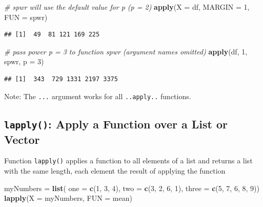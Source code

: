 \documentclass[]{book}
\newenvironment{Shaded}{\begin{snugshade}}{\end{snugshade}}
\newcommand{\CommentTok}[1]{\textcolor[rgb]{0.56,0.35,0.01}{\textit{#1}}}
\newcommand{\DataTypeTok}[1]{\textcolor[rgb]{0.13,0.29,0.53}{#1}}
\newcommand{\DecValTok}[1]{\textcolor[rgb]{0.00,0.00,0.81}{#1}}
\newcommand{\KeywordTok}[1]{\textcolor[rgb]{0.13,0.29,0.53}{\textbf{#1}}}
\newcommand{\NormalTok}[1]{#1}
\newcommand{\StringTok}[1]{\textcolor[rgb]{0.31,0.60,0.02}{#1}}
\begin{document}
\begin{Shaded}
\begin{Highlighting}[]
\CommentTok{# spwr will use the default value for p (p = 2)}
\KeywordTok{apply}\NormalTok{(}\DataTypeTok{X =}\NormalTok{ df, }\DataTypeTok{MARGIN =} \DecValTok{1}\NormalTok{, }\DataTypeTok{FUN =}\NormalTok{ spwr) }
\end{Highlighting}
\end{Shaded}

\begin{verbatim}
## [1]  49  81 121 169 225
\end{verbatim}

\begin{Shaded}
\begin{Highlighting}[]
\CommentTok{# pass power p = 3 to function spwr (argument names omitted)}
\KeywordTok{apply}\NormalTok{(df, }\DecValTok{1}\NormalTok{, spwr, }\DataTypeTok{p =} \DecValTok{3}\NormalTok{) }
\end{Highlighting}
\end{Shaded}

\begin{verbatim}
## [1]  343  729 1331 2197 3375
\end{verbatim}

Note: The \texttt{...} argument works for all \texttt{..apply..} functions.

\hypertarget{lapply-apply-a-function-over-a-list-or-vector}{%
\subsection{\texorpdfstring{\texttt{lapply()}: Apply a Function over a List or Vector}{lapply(): Apply a Function over a List or Vector}}\label{lapply-apply-a-function-over-a-list-or-vector}}

Function \texttt{lapply()} applies a function to all elements of a list and returns a list with the same length, each element the result of applying the function

\begin{Shaded}
\begin{Highlighting}[]
\NormalTok{myNumbers =}\StringTok{ }\KeywordTok{list}\NormalTok{(}
    \DataTypeTok{one =} \KeywordTok{c}\NormalTok{(}\DecValTok{1}\NormalTok{, }\DecValTok{3}\NormalTok{, }\DecValTok{4}\NormalTok{), }
    \DataTypeTok{two =} \KeywordTok{c}\NormalTok{(}\DecValTok{3}\NormalTok{, }\DecValTok{2}\NormalTok{, }\DecValTok{6}\NormalTok{, }\DecValTok{1}\NormalTok{), }
    \DataTypeTok{three =} \KeywordTok{c}\NormalTok{(}\DecValTok{5}\NormalTok{, }\DecValTok{7}\NormalTok{, }\DecValTok{6}\NormalTok{, }\DecValTok{8}\NormalTok{, }\DecValTok{9}\NormalTok{))}
\KeywordTok{lapply}\NormalTok{(}\DataTypeTok{X =}\NormalTok{ myNumbers, }\DataTypeTok{FUN =}\NormalTok{ mean)}
\end{Highlighting}
\end{Shaded}
\end{document}
